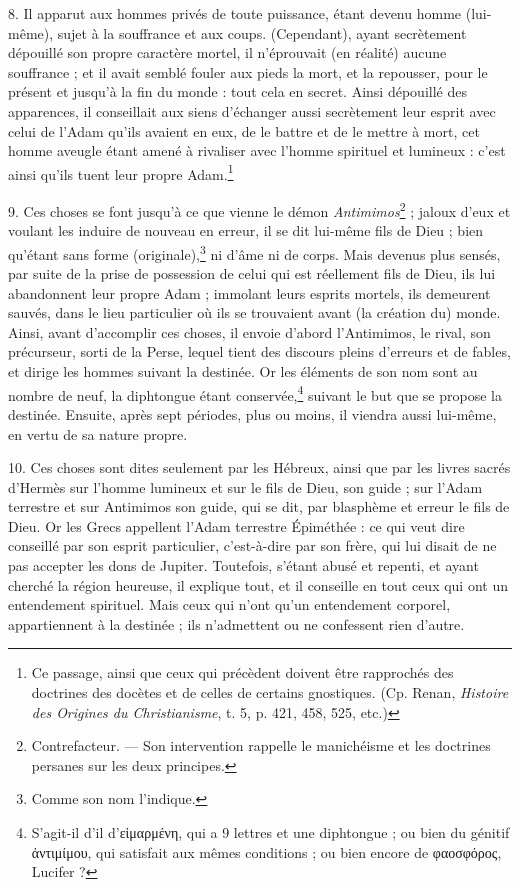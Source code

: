 \documentclass[landscape, a4paper, 11pt, oneside, polutonikogreek, french]{article}
\begin{document}
8. Il apparut aux hommes privés de toute puissance, étant devenu homme (lui-même), sujet à la souffrance et aux coups. (Cependant), ayant secrètement dépouillé son propre caractère mortel, il n'éprouvait (en réalité) aucune souffrance ; et il avait semblé fouler aux pieds la mort, et la repousser, pour le présent et jusqu'à la fin du monde : tout cela en secret. Ainsi dépouillé des apparences, il conseillait aux siens d'échanger aussi secrètement leur esprit avec celui de l'Adam qu'ils avaient en eux, de le battre et de le mettre à mort, cet homme aveugle étant amené à rivaliser avec l'homme spirituel et lumineux : c'est ainsi qu'ils tuent leur propre Adam.\footnote{Ce passage, ainsi que ceux qui précèdent doivent être rapprochés des doctrines des docètes et de celles de certains gnostiques. (Cp. Renan, \emph{Histoire des Origines du Christianisme}, t. 5, p. 421, 458, 525, etc.)}

9. Ces choses se font jusqu'à ce que vienne le démon \emph{Antimimos}\footnote{Contrefacteur. --- Son intervention rappelle le manichéisme et les doctrines persanes sur les deux principes.} ; jaloux d'eux et voulant les induire de nouveau en erreur, il se dit lui-même fils de Dieu ; bien qu'étant sans forme (originale),\footnote{Comme son nom l'indique.} ni d'âme ni de corps. Mais devenus plus sensés, par suite de la prise de possession de celui qui est réellement fils de Dieu, ils lui abandonnent leur propre Adam ; immolant leurs esprits mortels, ils demeurent sauvés, dans le lieu particulier où ils se trouvaient avant (la création du) monde. Ainsi, avant d'accomplir ces choses, il envoie d'abord l'Antimimos, le rival, son précurseur, sorti de la Perse, lequel tient des discours pleins d'erreurs et de fables, et dirige les hommes suivant la destinée. Or les éléments de son nom sont au nombre de neuf, la diphtongue étant conservée,\footnote{S'agit-il d'il d'εἱμαρμένη, qui a 9 lettres et une diphtongue ; ou bien du génitif ἀντιμίμου, qui satisfait aux mêmes conditions ; ou bien encore de φαοσφόρος, Lucifer ?} suivant le but que se propose la destinée. Ensuite, après sept périodes, plus ou moins, il viendra aussi lui-même, en vertu de sa nature propre.

10. Ces choses sont dites seulement par les Hébreux, ainsi que par les livres sacrés d'Hermès sur l'homme lumineux et sur le fils de Dieu, son guide ; sur l'Adam terrestre et sur Antimimos son guide, qui se dit, par blasphème et erreur le fils de Dieu. Or les Grecs appellent l'Adam terrestre Épiméthée : ce qui veut dire conseillé par son esprit particulier, c'est-à-dire par son frère, qui lui disait de ne pas accepter les dons de Jupiter. Toutefois, s'étant abusé et repenti, et ayant cherché la région heureuse, il explique tout, et il conseille en tout ceux qui ont un entendement spirituel. Mais ceux qui n'ont qu'un entendement corporel, appartiennent à la destinée ; ils n'admettent ou ne confessent rien d'autre.
\end{document}

